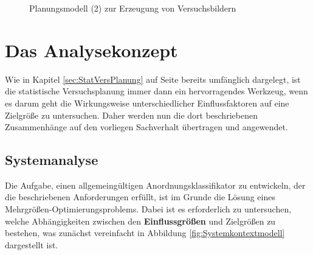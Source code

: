 \documentclass[
fontsize=10pt, 
listof = totoc,
parskip = half	
]{report}
\begin{document}
\begin{figure}[H]

	\caption{Planungsmodell (2) zur Erzeugung von Versuchsbildern}
	\label{fig:Planungsmodell(2)}
\end{figure}


\section{Das Analysekonzept}

Wie in Kapitel \ref{sec:StatVersPlanung} auf Seite \pageref{sec:StatVersPlanung} bereits umfänglich dargelegt, ist die statistische Versuchsplanung immer dann ein hervorragendes Werkzeug, wenn es darum geht die Wirkungsweise unterschiedlicher Einflussfaktoren auf eine Zielgröße zu untersuchen. Daher werden nun die dort beschriebenen Zusammenhänge auf den vorliegen Sachverhalt übertragen und angewendet.


\subsection{Systemanalyse}
Die Aufgabe, einen allgemeingültigen Anordnungsklassifikator zu entwickeln, der die beschriebenen Anforderungen erfüllt, ist im Grunde die Lösung eines Mehrgrößen-Optimierungsproblems. Dabei ist es erforderlich zu untersuchen, welche Abhängigkeiten zwischen den \textbf{Einflussgrößen} und Zielgrößen zu bestehen, was zunächst vereinfacht in Abbildung \ref{fig:Systemkontextmodell} dargestellt ist.
       
\end{document}

